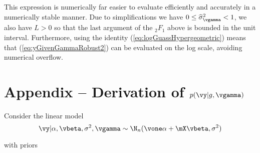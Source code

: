 \noindent This expression is numerically far easier to evaluate efficiently and accurately in a numerically stable manner. Due to simplifications
we have $0\le \widehat{\sigma}_\vgamma^2<1$, we also have $L>0$ so that the last argument
of the ${}_2F_1$ above is bounded in the unit interval. Furthermore, using
the identity (\ref{eq:logGuassHypergeometric}) means that (\ref{eq:yGivenGammaRobust2}) can be evaluated
on the log scale, avoiding numerical overflow.



\section{Appendix -- Derivation of $p(\vy | g, \vgamma)$}

\noindent Consider the linear model
\[
	\vy | \alpha, \vbeta, \sigma^2, \vgamma \sim \N_n(\vone \alpha + \mX \vbeta, \sigma^2)
\]

\noindent with priors

